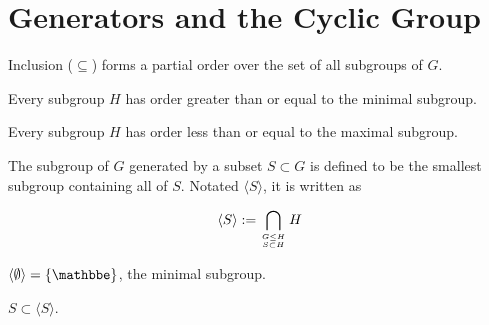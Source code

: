 \section{Generators and the Cyclic Group}

\begin{theorem}
    \label{theorem : subgroupOrder}
    \leanok
    Inclusion ($\subseteq$) forms a partial order over the set of all subgroups of $G$.
\end{theorem}

\begin{theorem}
    \label{theorem : Minimal_smallest}
    \leanok
    Every subgroup $H$ has order greater than or equal to the minimal subgroup.
\end{theorem}

\begin{theorem}
    \label{theorem : Maximal_largest}
    \leanok
    Every subgroup $H$ has order less than or equal to the maximal subgroup.
\end{theorem}

\begin{definition}
    \label{definition : Generate}
    \leanok
    The subgroup of $G$ generated by a subset $S \subset G$ is defined to be the smallest subgroup containing all of $S$. Notated $\langle S \rangle$, it is written as

    \begin{equation*}
        \langle S \rangle := \bigcap_{\genfrac{}{}{0pt}{}{G \le H}{S \subset H}} H
    \end{equation*}
\end{definition}

\begin{theorem}
    \label{theorem : Generate_empty}
    \leanok
    $\langle \emptyset \rangle = \{\mathbbe\}$, the minimal subgroup.
\end{theorem}

\begin{theorem}
    \label{theorem : Generate_contain_set}
    \leanok
    $S \subset \langle S \rangle$.
\end{theorem}

